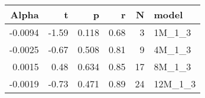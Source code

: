 \begin{table}[ht]
\centering
\begin{tabular}{rrrrrl}
  \hline
Alpha & t & p & r & N & model \\ 
  \hline
-0.0094 & -1.59 & 0.118 & 0.68 & 3 & 1M\_1\_3 \\ 
  -0.0025 & -0.67 & 0.508 & 0.81 & 9 & 4M\_1\_3 \\ 
  0.0015 & 0.48 & 0.634 & 0.85 & 17 & 8M\_1\_3 \\ 
  -0.0019 & -0.73 & 0.471 & 0.89 & 24 & 12M\_1\_3 \\ 
   \hline
\end{tabular}
\end{table}

